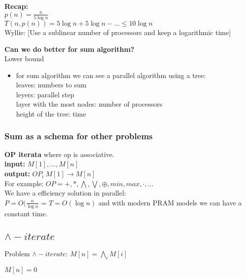 \textbf{Recap:}\\
$p(n) = \frac{n}{5 \log{n}}$\\
$T(n, p(n)) = 5\log{n} + 5\log{n} - \dots \leq 10\log{n}$\\
Wyllie: [Use a sublinear number of processors and keep a logarithmic time]

\textbf{Can we do better for sum algorithm?}\\
Lower bound\\
\begin{itemize}
 \item for sum algorithm we can see a parallel algorithm using a tree:\\
 leaves: numbers to sum\\
 leyers: parallel step\\
 layer with the most nodes: number of processors\\
 height of the tree: time\\
\end{itemize}

\subsubsection{Sum as a schema for other problems}

\textbf{OP iterata} where op is associative.\\
\textbf{input:} $M[1], \dots, M[n]$\\
\textbf{output:} $OP_i \ M[1] \rightarrow M[n]$\\
For example: $OP = +, *, \bigwedge, \bigvee, \oplus, min, max, \cdot, \dots$\\
We have a efficiency solution in parallel:\\
$P = O(\frac{n}{\log{n}}$ = $T = O(\log{n})$ and with modern PRAM models we can have a constant time.\\

\subsection{$\wedge-iterate$}

Problem $\wedge-iterate$: $M[n] = \bigwedge_{i}{M[i]}$ 

\begin{algorithm}[H]
 \SetAlgoLined
  {
   {   
   $M[n] = 0$ 
  }
 }
 \caption{$\wedge-iterate$}
\end{algorithm}

